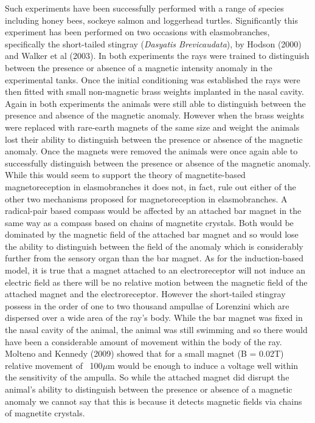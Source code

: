 \documentclass[12pt]{article}
\begin{document}
Such experiments have been successfully performed with a range of species including honey bees, sockeye salmon and loggerhead turtles\cite{Walker:2003}\cite{Kirschvink:2001}. Significantly this experiment has been performed on two occasions with elasmobranches, specifically the short-tailed stingray (\textit{Dasyatis Brevicaudata}), by Hodson (2000) and Walker et al (2003). In both experiments the rays were trained to distinguish between the presence or absence of a magnetic intensity anomaly in the experimental tanks. Once the initial conditioning was established the rays were then fitted with small non-magnetic brass weights implanted in the nasal cavity. Again in both experiments the animals were still able to distinguish between the presence and absence of the magnetic anomaly. However when the brass weights were replaced with rare-earth magnets of the same size and weight the animals lost their ability to distinguish between the presence or absence of the magnetic anomaly. Once the magnets were removed the animals were once again able to successfully distinguish between the presence or absence of the magnetic anomaly. While this would seem to support the theory of magnetite-based magnetoreception in elasmobranches it does not, in fact, rule out either of the other two mechanisms proposed for magnetoreception in elasmobranches. A radical-pair based compass would be affected by an attached bar magnet in the same way as a compass based on chains of magnetite crystals. Both would be dominated by the magnetic field of the attached bar magnet and so would lose the ability to distinguish between the field of the anomaly which is considerably further from the sensory organ than the bar magnet. As for the induction-based model, it is true that a magnet attached to an electroreceptor will not induce an electric field as there will be no relative motion between the magnetic field of the attached magnet and the electroreceptor. However the short-tailed stingray possess in the order of one to two thousand ampullae of Lorenzini which are dispersed over a wide area of the ray's body\cite{Montgomery:1999}. While the bar magnet was fixed in the nasal cavity of the animal, the animal was still swimming and so there would have been a considerable amount of movement within the body of the ray. Molteno and Kennedy (2009) showed that for a small magnet (B = 0.02T) relative movement of ~100$\mu$m would be enough to induce a voltage well within the sensitivity of the ampulla. So while the attached magnet did disrupt the animal's ability to distinguish between the presence or absence of a magnetic anomaly we cannot say that this is because it detects magnetic fields via chains of magnetite crystals. 
\end{document}
